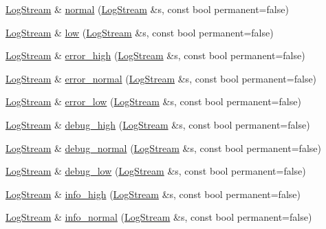 \begin{DoxyCompactItemize}
\hyperlink{classkisscpp_1_1_log_stream}{Log\-Stream} \& \hyperlink{namespacekisscpp_1_1manip_a8f9aa3f28fd54225dee006e014efcf65}{normal} (\hyperlink{classkisscpp_1_1_log_stream}{Log\-Stream} \&s, const bool permanent=false)
\item 
\hyperlink{classkisscpp_1_1_log_stream}{Log\-Stream} \& \hyperlink{namespacekisscpp_1_1manip_a934867d04be842b8f6e9df5dfa07f40e}{low} (\hyperlink{classkisscpp_1_1_log_stream}{Log\-Stream} \&s, const bool permanent=false)
\item 
\hyperlink{classkisscpp_1_1_log_stream}{Log\-Stream} \& \hyperlink{namespacekisscpp_1_1manip_aee969aa657dcd750d102fc48a29ba516}{error\-\_\-high} (\hyperlink{classkisscpp_1_1_log_stream}{Log\-Stream} \&s, const bool permanent=false)
\item 
\hyperlink{classkisscpp_1_1_log_stream}{Log\-Stream} \& \hyperlink{namespacekisscpp_1_1manip_af7d168675689cf70931df8d3acb4b4e9}{error\-\_\-normal} (\hyperlink{classkisscpp_1_1_log_stream}{Log\-Stream} \&s, const bool permanent=false)
\item 
\hyperlink{classkisscpp_1_1_log_stream}{Log\-Stream} \& \hyperlink{namespacekisscpp_1_1manip_ab5930b238c7e5301822bc09c41120a59}{error\-\_\-low} (\hyperlink{classkisscpp_1_1_log_stream}{Log\-Stream} \&s, const bool permanent=false)
\item 
\hyperlink{classkisscpp_1_1_log_stream}{Log\-Stream} \& \hyperlink{namespacekisscpp_1_1manip_aaf086b98ab45fa8c08557762e019afb7}{debug\-\_\-high} (\hyperlink{classkisscpp_1_1_log_stream}{Log\-Stream} \&s, const bool permanent=false)
\item 
\hyperlink{classkisscpp_1_1_log_stream}{Log\-Stream} \& \hyperlink{namespacekisscpp_1_1manip_ac4893fff26af38ff60229792840064b3}{debug\-\_\-normal} (\hyperlink{classkisscpp_1_1_log_stream}{Log\-Stream} \&s, const bool permanent=false)
\item 
\hyperlink{classkisscpp_1_1_log_stream}{Log\-Stream} \& \hyperlink{namespacekisscpp_1_1manip_a14eb82a3948c039a023b254d02e4dd01}{debug\-\_\-low} (\hyperlink{classkisscpp_1_1_log_stream}{Log\-Stream} \&s, const bool permanent=false)
\item 
\hyperlink{classkisscpp_1_1_log_stream}{Log\-Stream} \& \hyperlink{namespacekisscpp_1_1manip_a0e2079570591f8a3cc788872b65c6580}{info\-\_\-high} (\hyperlink{classkisscpp_1_1_log_stream}{Log\-Stream} \&s, const bool permanent=false)
\item 
\hyperlink{classkisscpp_1_1_log_stream}{Log\-Stream} \& \hyperlink{namespacekisscpp_1_1manip_aee465aa1a8d15e1750422696f7d3dc81}{info\-\_\-normal} (\hyperlink{classkisscpp_1_1_log_stream}{Log\-Stream} \&s, const bool permanent=false)

\end{DoxyCompactItemize}
